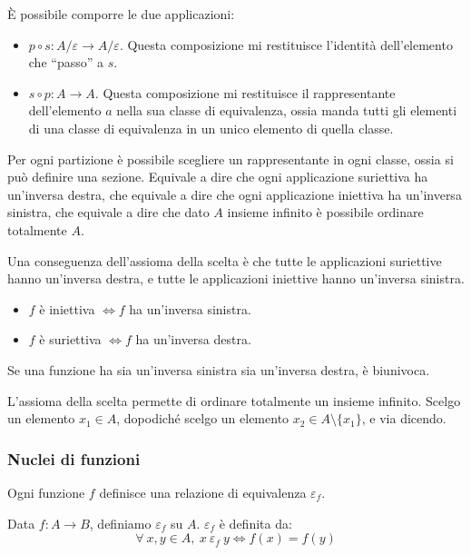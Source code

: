 \`E possibile comporre le due applicazioni:
\begin{itemize}
  \item $p \circ s: A / \varepsilon \to A / \varepsilon$. Questa composizione mi restituisce l'identit\`a dell'elemento che ``passo'' a $s$.
  \item $s \circ p : A \to A$. Questa composizione mi restituisce il rappresentante dell'elemento $a$ nella sua classe di equivalenza, ossia manda tutti gli elementi di una classe di equivalenza in un unico elemento di quella classe.
\end{itemize}

\begin{theorem}
Per ogni partizione \`e possibile scegliere un rappresentante in ogni classe, ossia si pu\`o definire una sezione. Equivale a dire che ogni applicazione suriettiva ha un'inversa destra, che equivale a dire che ogni applicazione iniettiva ha un'inversa sinistra, che equivale a dire che dato $A$ insieme infinito \`e possibile ordinare totalmente $A$.
\end{theorem}

Una conseguenza dell'assioma della scelta \`e che tutte le applicazioni suriettive hanno un'inversa destra, e tutte le applicazioni iniettive hanno un'inversa sinistra.
\begin{itemize}
  \item $f$ \`e iniettiva $\Leftrightarrow f$ ha un'inversa sinistra.
  \item $f$ \`e suriettiva $\Leftrightarrow f$ ha un'inversa destra.
\end{itemize}
Se una funzione ha sia un'inversa sinistra sia un'inversa destra, \`e biunivoca.

L'assioma della scelta permette di ordinare totalmente un insieme infinito. Scelgo un elemento $x_1 \in A$, dopodich\'e scelgo un elemento $x_2 \in A \setminus \{x_1\}$, e via dicendo.

\subsubsection{Nuclei di funzioni}

Ogni funzione $f$ definisce una relazione di equivalenza $\varepsilon_f$. 

\begin{defn}
Data $f : A \to B$, definiamo $\varepsilon_f$ su $A$. $\varepsilon_f$ \`e definita da:
\[
\forall \ x, y \in A , \ x \ \varepsilon_f \ y \Leftrightarrow f(x) = f(y)
\]
\end{defn}

